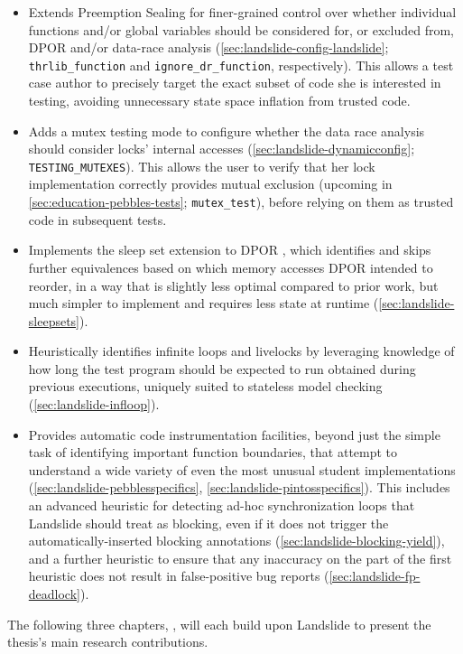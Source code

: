 {\begin{itemize}
	\item Extends Preemption Sealing for finer-grained control
		over whether individual functions and/or global variables
		should be considered for, or excluded from,
		DPOR and/or data-race analysis
		(\cref{sec:landslide-config-landslide};
		{\tt thrlib\_function} and {\tt ignore\_dr\_function}, respectively).
		This allows a test case author to precisely target the exact subset of code
		she is interested in testing,
		avoiding unnecessary state space inflation from trusted code.
	\item Adds a mutex testing mode to configure whether the
		data race analysis should consider locks' internal accesses
		(\cref{sec:landslide-dynamicconfig}; {\tt TESTING\_MUTEXES}).
		This allows the user to verify that her lock implementation
		correctly provides mutual exclusion
		(upcoming in \cref{sec:education-pebbles-tests}; {\tt mutex\_test}),
		before relying on them as trusted code in subsequent tests.
	\item Implements the sleep set extension to DPOR \cite{partial-order-methods,dpor,optimal-dpor},
		which identifies and skips further equivalences based on which memory accesses
		DPOR intended to reorder,
		in a way that is slightly less optimal compared to prior work,
		but much simpler to implement
		and requires less state at runtime (\cref{sec:landslide-sleepsets}).
	\item Heuristically identifies infinite loops and livelocks
		by leveraging knowledge of how long the test program should be expected to run
		obtained during previous executions,
		uniquely suited to stateless model checking (\cref{sec:landslide-infloop}).
	\item Provides automatic code instrumentation facilities,
		beyond just the simple task of identifying important function boundaries,
		that attempt to understand a wide variety of even the most unusual student implementations
		(\cref{sec:landslide-pebblesspecifics},
		\cref{sec:landslide-pintosspecifics}).
		This includes an advanced heuristic for detecting ad-hoc synchronization loops
		that Landslide should treat as blocking, %
		even if it does not trigger the automatically-inserted blocking annotations
		(\cref{sec:landslide-blocking-yield}),
		and a further heuristic to ensure that any inaccuracy on the part of the first heuristic
		does not result in false-positive bug reports (\cref{sec:landslide-fp-deadlock}).
\end{itemize}

The following three chapters, ,
will each build upon Landslide to present the thesis's main research contributions.}
